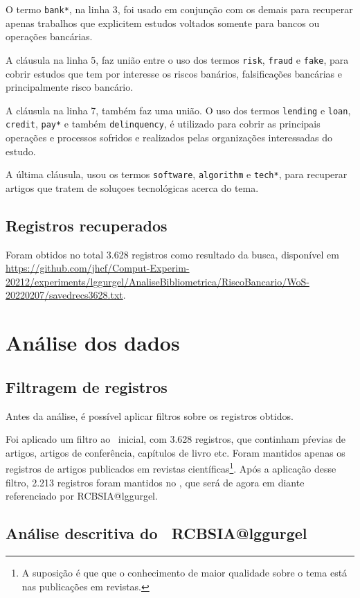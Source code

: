 O termo \texttt{bank*}, na linha 3, foi usado em conjunção com os demais para recuperar apenas trabalhos que explicitem estudos voltados somente para bancos ou operações bancárias.

A cláusula  na linha 5, faz união entre o uso dos termos \texttt{risk}, \texttt{fraud} e \texttt{fake}, para cobrir estudos que tem por interesse os riscos banários, falsificações bancárias e principalmente risco bancário.

A cláusula  na linha 7, também faz uma união. O uso dos termos \texttt{lending} e \texttt{loan}, \texttt{credit}, \texttt{pay*} e também \texttt{delinquency}, é utilizado para cobrir as principais operações e processos sofridos e realizados pelas organizações interessadas do estudo.

A última cláusula, usou os termos \texttt{software}, \texttt{algorithm} e \texttt{tech*}, para recuperar artigos que tratem de soluçoes tecnológicas acerca do tema.

\subsection{Registros recuperados}

Foram obtidos no total 3.628 registros como resultado da busca, disponível em \url{https://github.com/jhcf/Comput-Experim-20212/experiments/lggurgel/AnaliseBibliometrica/RiscoBancario/WoS-20220207/savedrecs3628.txt}. 


\section{Análise dos dados}

\subsection{Filtragem de registros}
Antes da análise, é possível aplicar filtros sobre os registros obtidos.

Foi aplicado um filtro ao \dataset\   inicial, com 3.628 registros, que continham pŕevias de artigos, artigos de conferência, capítulos de livro etc. Foram mantidos apenas os registros de artigos publicados em revistas científicas\footnote{A suposição é que que o conhecimento de maior qualidade sobre o tema está nas publicações em revistas.}. Após a aplicação desse filtro, 2.213 registros foram mantidos no \dataset, que será de agora em diante referenciado por RCBSIA@lggurgel.

\subsection{Análise descritiva do \dataset\   RCBSIA@lggurgel}

